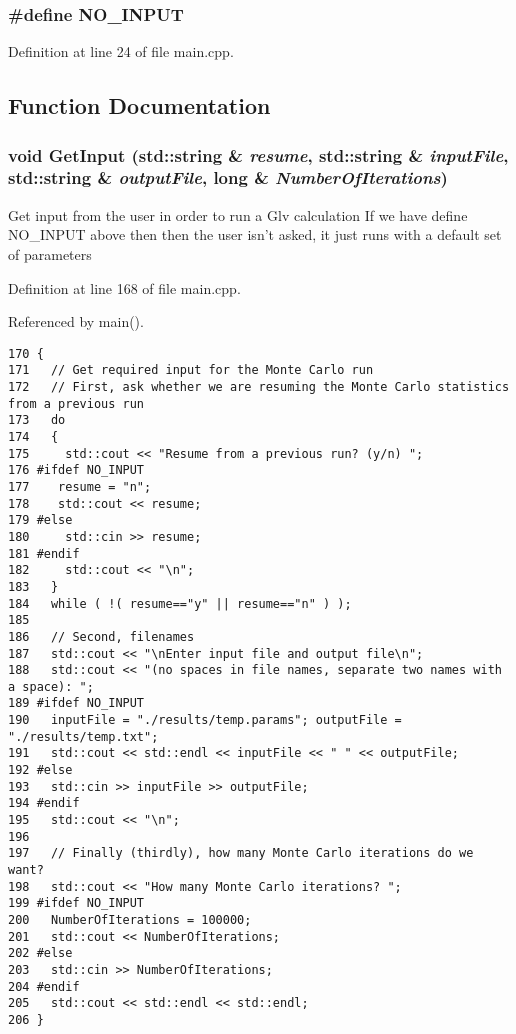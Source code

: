 \subsubsection{\setlength{\rightskip}{0pt plus 5cm}\#define NO\_\-INPUT}\label{main_8cpp_d62650a8615e3aa9191d667f58c439f0}




Definition at line 24 of file main.cpp.

\subsection{Function Documentation}
\subsubsection{\setlength{\rightskip}{0pt plus 5cm}void GetInput (std::string \& {\em resume}, std::string \& {\em inputFile}, std::string \& {\em outputFile}, long \& {\em NumberOfIterations})}\label{main_8cpp_255d3fd88277d4303927db8316098dc7}


Get input from the user in order to run a Glv calculation If we have define NO\_\-INPUT above then then the user isn't asked, it just runs with a default set of parameters 

Definition at line 168 of file main.cpp.

Referenced by main().

\begin{Code}\begin{verbatim}170 {
171   // Get required input for the Monte Carlo run
172   // First, ask whether we are resuming the Monte Carlo statistics from a previous run
173   do
174   {
175     std::cout << "Resume from a previous run? (y/n) ";
176 #ifdef NO_INPUT
177    resume = "n";
178    std::cout << resume;
179 #else
180     std::cin >> resume;
181 #endif
182     std::cout << "\n";
183   } 
184   while ( !( resume=="y" || resume=="n" ) );
185   
186   // Second, filenames
187   std::cout << "\nEnter input file and output file\n";
188   std::cout << "(no spaces in file names, separate two names with a space): ";
189 #ifdef NO_INPUT
190   inputFile = "./results/temp.params"; outputFile = "./results/temp.txt";
191   std::cout << std::endl << inputFile << " " << outputFile;
192 #else
193   std::cin >> inputFile >> outputFile;
194 #endif
195   std::cout << "\n";
196   
197   // Finally (thirdly), how many Monte Carlo iterations do we want?
198   std::cout << "How many Monte Carlo iterations? ";
199 #ifdef NO_INPUT
200   NumberOfIterations = 100000;
201   std::cout << NumberOfIterations;
202 #else
203   std::cin >> NumberOfIterations;
204 #endif
205   std::cout << std::endl << std::endl;
206 }
\end{verbatim}
\end{Code}



